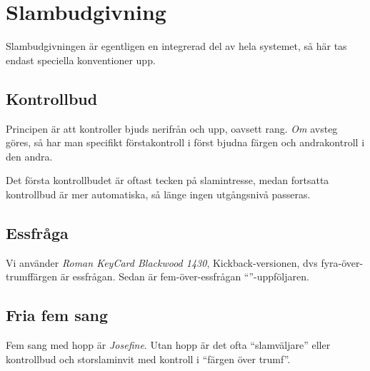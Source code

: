 \chapter{Slambudgivning}

Slambudgivningen är egentligen en integrerad del av hela systemet, så här
tas endast speciella konventioner upp.

\section{Kontrollbud}

Principen är att kontroller bjuds nerifrån och upp, oavsett rang. \emph{Om}
avsteg göres, så har man specifikt förstakontroll i först bjudna färgen och
andrakontroll i den andra.

Det första kontrollbudet är oftast tecken på slamintresse, medan fortsatta
kontrollbud är mer automatiska, så länge ingen utgångsnivå passeras.

\section{Essfråga}

Vi använder \emph{Roman KeyCard Blackwood 1430}, Kickback-versionen, dvs
fyra-över-trumffärgen är essfrågan. Sedan är fem-över-essfrågan
``''-uppföljaren. 

\section{Fria fem sang}

Fem sang med hopp är \emph{Josefine}. Utan hopp är det ofta ``slamväljare''
eller kontrollbud och storslaminvit med kontroll i ``färgen över trumf''.
